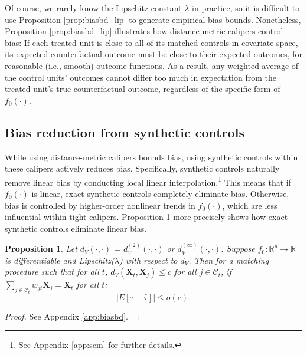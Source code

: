 \documentclass{article}
\newtheorem{proposition}[theorem]{Proposition}
\newcommand{\Xt}{\mathbf{X}_t}
\newcommand{\Xj}{\mathbf{X}_j}
\newcommand{\Ct}{\mathcal{C}_{t}}
\newcommand{\note}[1]{\textcolor{red}{\textit{#1}}}
\begin{document}
Of course, we rarely know the Lipschitz constant $\lambda$ in practice, so it is difficult to use Proposition \ref{prop:biasbd_lip} to generate empirical bias bounds.
Nonetheless, Proposition \ref{prop:biasbd_lip} illustrates how distance-metric calipers control bias:
If each treated unit is close to all of its matched controls in covariate space, its expected counterfactual outcome must be close to their expected outcomes, for reasonable (i.e., smooth) outcome functions.
As a result, any weighted average of the control units' outcomes cannot differ too much in expectation from the treated unit's true counterfactual outcome, regardless of the specific form of $f_0(\cdot)$.

\subsection{Bias reduction from synthetic controls}
\label{sec:biasbdscm}


While using distance-metric calipers bounds bias, using synthetic controls within these calipers actively reduces bias.
Specifically, synthetic controls naturally remove linear bias by conducting local linear interpolation.\footnote{See Appendix \ref{app:scm} for further details.}
This means that if $f_0(\cdot)$ is linear, exact synthetic controls completely eliminate bias.
Otherwise, bias is controlled by higher-order nonlinear trends in $f_0(\cdot)$, which are less influential within tight calipers.
Proposition \ref{prop:scbiasbd} more precisely shows how exact synthetic controls eliminate linear bias.
\begin{proposition}
\label{prop:scbiasbd}
Let $d_V(\cdot, \cdot)$ = $d^{(2)}_V(\cdot, \cdot)$ or $d^{(\infty)}_V(\cdot, \cdot)$.
Suppose $f_0: \mathbb{R}^p \to \mathbb{R}$ is differentiable and Lipschitz($\lambda$) with respect to $d_V$.
Then for a matching procedure such that for all $t$, $d_V(\Xt, \Xj) \leq c$ for all $j \in \Ct$,
if $\sum_{j \in \Ct} w_{jt} \Xj = \Xt$ for all $t$:
\begin{equation*}
    \big|E[\tau - \hat{\tau}] \big| \leq o(c).
\end{equation*}
\end{proposition}
\begin{proof}
    See Appendix \ref{app:biasbd}.
\end{proof}
\end{document}
